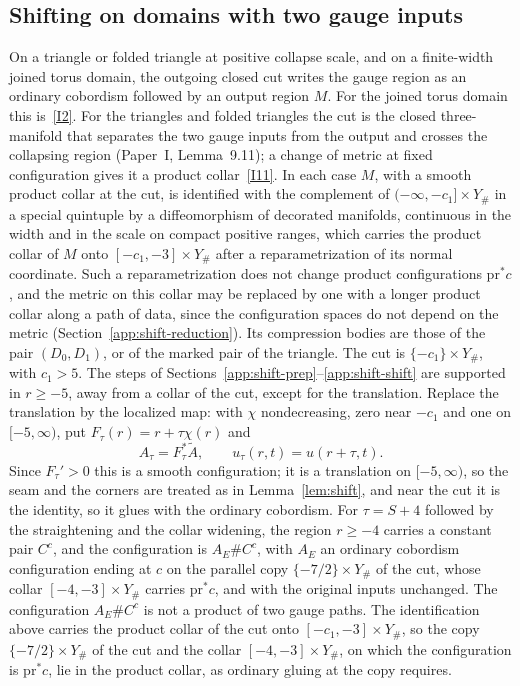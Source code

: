 \documentclass[11pt]{amsart}
\theoremstyle{definition}
\theoremstyle{remark}
\theoremstyle{plain}
\numberwithin{equation}{section}
\begin{document}
\subsection{Shifting on domains with two gauge inputs}\label{app:shift-local}
On a triangle or folded triangle at positive collapse scale, and on a
finite-width joined torus domain, the outgoing closed cut writes the gauge
region as an ordinary cobordism followed by an output region $M$. For the
joined torus domain this is~\ref{I2}. For the triangles and folded
triangles the cut is the closed three-manifold that separates the two
gauge inputs from the output and crosses the collapsing region
(Paper~I, Lemma~9.11); a change of metric at fixed configuration gives
it a product collar~\ref{I11}.
In each case $M$, with a smooth product collar at the cut, is identified
with the complement of $(-\infty,-c_1]\times Y_\#$ in a special quintuple by a
diffeomorphism of decorated manifolds, continuous in the width and in the
scale on compact positive ranges, which carries the product collar of $M$
onto $[-c_1,-3]\times Y_\#$ after a reparametrization of its normal
coordinate. Such a reparametrization does not change product
configurations $\mathrm{pr}^*c$, and the metric on this collar may be
replaced by one with a longer product collar along a path of data, since
the configuration spaces do not depend on the metric
(Section~\ref{app:shift-reduction}). Its compression bodies are those of the
pair $(D_0,D_1)$, or of the marked pair of the triangle. The cut is
$\{-c_1\}\times Y_\#$, with $c_1>5$. The steps of
Sections~\ref{app:shift-prep}--\ref{app:shift-shift} are supported in
$r\ge-5$, away from a collar of the cut, except for the translation. Replace
the translation by the localized map: with $\chi$ nondecreasing, zero near
$-c_1$ and one on $[-5,\infty)$, put $F_\tau(r)=r+\tau\chi(r)$ and
\[
 A_\tau=F_\tau^*\widetilde A,\qquad u_\tau(r,t)=u(r+\tau,t).
\]
Since $F_\tau'>0$ this is a smooth configuration; it is a translation on
$[-5,\infty)$, so the seam and the corners are treated as in
Lemma~\ref{lem:shift}, and near the cut it is the identity, so it glues with
the ordinary cobordism. For $\tau=S+4$ followed by the straightening and
the collar widening, the region $r\ge-4$ carries a constant pair $C^c$, and the configuration is
$A_E\#C^c$, with $A_E$ an ordinary cobordism configuration ending at $c$ on
the parallel copy $\{-7/2\}\times Y_\#$ of the cut, whose collar
$[-4,-3]\times Y_\#$ carries $\mathrm{pr}^*c$, and with the original inputs
unchanged. The configuration $A_E\#C^c$ is not a product of two gauge
paths. The identification above carries the product collar of the cut
onto $[-c_1,-3]\times Y_\#$, so the copy $\{-7/2\}\times Y_\#$ of the cut
and the collar $[-4,-3]\times Y_\#$, on which the configuration is
$\mathrm{pr}^*c$, lie in the product collar, as ordinary gluing at the
copy requires.
\end{document}
